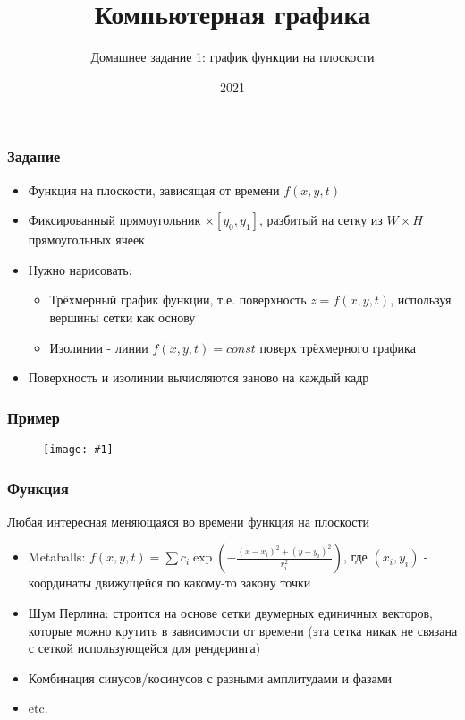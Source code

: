 \documentclass{beamer}
\title{Компьютерная графика}
\subtitle{Домашнее задание 1: график функции на плоскости}
\date{2021}
\newcommand{\slideimage}[1]{
  \begin{figure}
    \begin{adjustbox}{width=\textwidth, totalheight=\textheight-2\baselineskip-2\baselineskip,keepaspectratio}
      \texttt{[image: \#1]}
    \end{adjustbox}
  \end{figure}
}
\begin{document}
\frame{\titlepage}

\begin{frame}[fragile]
\frametitle{Задание}
\begin{itemize}
\item Функция на плоскости, зависящая от времени \begin{math}f(x, y, t)\end{math}
\pause
\item Фиксированный прямоугольник \begin{math}[x_0, x_1] \times [y_0, y_1]\end{math}, разбитый на сетку из \begin{math}W\times H\end{math} прямоугольных ячеек
\pause
\item Нужно нарисовать:
\begin{itemize}
\item Трёхмерный график функции, т.е. поверхность \begin{math}z = f(x, y, t)\end{math}, используя вершины сетки как основу
\pause
\item Изолинии - линии \begin{math}f(x,y,t) = const\end{math} поверх трёхмерного графика
\end{itemize}
\pause
\item Поверхность и изолинии вычисляются заново на каждый кадр
\end{itemize}
\end{frame}

\begin{frame}[fragile]
\frametitle{Пример}
\slideimage{matlab-plot.png}
\end{frame}

\begin{frame}[fragile]
\frametitle{Функция}
Любая интересная меняющаяся во времени функция на плоскости
\begin{itemize}
\item Metaballs: \begin{math}f(x,y,t) = \sum c_i\exp\left(-\frac{(x-x_i)^2+(y-y_i)^2}{r_i^2}\right)\end{math}, где \begin{math}(x_i, y_i)\end{math} - координаты движущейся по какому-то закону точки
\pause
\item Шум Перлина: строится на основе сетки двумерных единичных векторов, которые можно крутить в зависимости от времени (эта сетка никак не связана с сеткой использующейся для рендеринга)
\pause
\item Комбинация синусов/косинусов с разными амплитудами и фазами
\pause
\item etc.
\end{itemize}
\end{frame}
\end{document}
